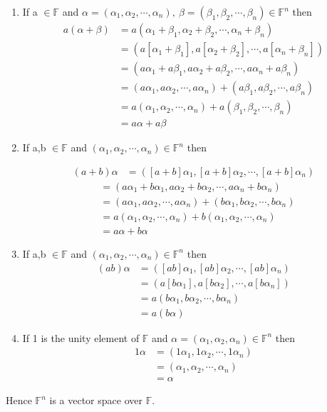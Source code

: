 \documentclass[journal,12pt,twocolumn]{IEEEtran}
\begin{document}
\begin{enumerate}
	\item If a $\in \mathbb{F}$ and $\alpha = (\alpha_1,\alpha_2,\cdots,\alpha_n), \ 
		\beta = (\beta_1,\beta_2,\cdots,\beta_n) \in \mathbb{F}^n $ then
		\begin{align}
			a(\alpha+\beta)&=a(\alpha_1+\beta_1,\alpha_2+\beta_2,\cdots,\alpha_n+\beta_n) \\
			&=(a[\alpha_1+\beta_1],a[\alpha_2+\beta_2],\cdots,a[\alpha_n+\beta_n]) \\
			&=(a\alpha_1+a\beta_1,a\alpha_2+a\beta_2,\cdots,a\alpha_n+a\beta_n) \\
			&=(a\alpha_1,a\alpha_2,\cdots,a\alpha_n)+(a\beta_1,a\beta_2,\cdots,a\beta_n) \\
			&=a(\alpha_1,\alpha_2,\cdots,\alpha_n)+a(\beta_1,\beta_2,\cdots,\beta_n) \\
			&=a\alpha+a\beta
		\end{align}
	\item If a,b $\in \mathbb{F}$ and $(\alpha_1,\alpha_2,\cdots,\alpha_n) \in \mathbb{F}^n$ then

		\begin{align}
			(a+b)\alpha&=([a+b]\alpha_1,[a+b]\alpha_2,\cdots,[a+b]\alpha_n) 
		\end{align}
		\begin{align}
                        &=(a\alpha_1+b\alpha_1,a\alpha_2+b\alpha_2,\cdots,a\alpha_n+b\alpha_n) \\ 
                        &=(a\alpha_1,a\alpha_2,\cdots,a\alpha_n)+(b\alpha_1,b\alpha_2,\cdots,b\alpha_n) \\
                        &=a(\alpha_1,\alpha_2,\cdots,\alpha_n)+b(\alpha_1,\alpha_2,\cdots,\alpha_n) \\
                        &=a\alpha+b\alpha
		\end{align}
	\item If a,b $\in \mathbb{F}$ and $(\alpha_1,\alpha_2,\cdots,\alpha_n) \in \mathbb{F}^n$ then
	\begin{align}
		(ab)\alpha&=([ab]\alpha_1,[ab]\alpha_2,\cdots,[ab]\alpha_n) \\
			  &=(a[b\alpha_1],a[b\alpha_2],\cdots,a[b\alpha_n]) \\
			  &=a(b\alpha_1,b\alpha_2,\cdots,b\alpha_n) \\
			  &=a(b\alpha)
	\end{align}
        \item If 1 is the unity element of $\mathbb{F}$ and $\alpha=(\alpha_1,\alpha_2,\alpha_n) \in 
		\mathbb{F}^n$ then
		\begin{align}
			1\alpha &=(1\alpha_1,1\alpha_2,\cdots,1\alpha_n) \\
			        &=(\alpha_1,\alpha_2,\cdots,\alpha_n) \\
				&= \alpha
		\end{align}
\end{enumerate}
Hence $\mathbb{F}^n$ is a vector space over $\mathbb{F}$.
\end{document}
